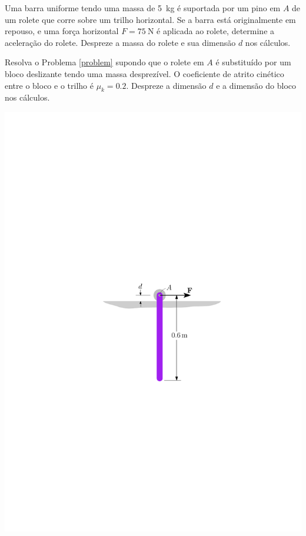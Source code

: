 \item\label{problem} Uma barra uniforme tendo uma massa de \SI{5}{\kilogram} é suportada por um pino em $A$ de um rolete que corre sobre um trilho horizontal. Se a barra está originalmente em repouso, e uma força horizontal $F=\SI{75}{\newton}$ é aplicada ao rolete, determine a aceleração do rolete. Despreze a massa do rolete
e sua dimensão $d$ nos cálculos.

\begin{minipage}{.4\linewidth}
	\vspace{-2cm}
	\item Resolva o Problema \ref{problem} supondo que o rolete em $A$ é substituído por um bloco deslizante tendo uma massa desprezível. O coeficiente de atrito cinético entre o bloco e o trilho é $\mu_{k}=0.2$. Despreze a dimensão $d$ e a dimensão do bloco nos cálculos.
\end{minipage}
\begin{minipage}{.6\linewidth}
	\begin{flushright}
		\includegraphics[scale=.9]{../../images/draw_11}
	\end{flushright}
\end{minipage}